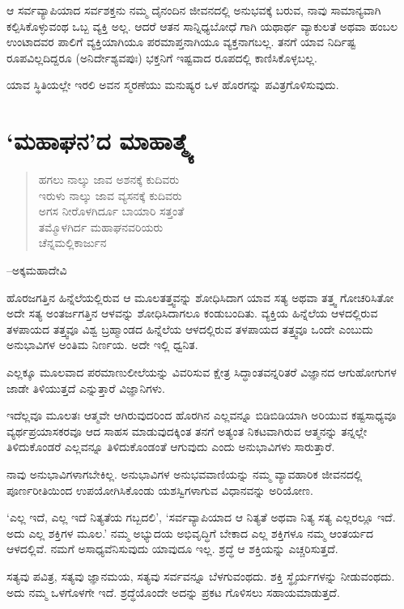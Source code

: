 ಆ ಸರ್ವವ್ಯಾಪಿಯಾದ ಸರ್ವಶಕ್ತನು ನಮ್ಮ ದೈನಂದಿನ ಜೀವನದಲ್ಲಿ ಅನುಭವಕ್ಕೆ ಬರುವ, ನಾವು ಸಾಮಾನ್ಯವಾಗಿ ಕಲ್ಪಿಸಿಕೊಳ್ಳುವಂಥ ಒಬ್ಬ ವ್ಯಕ್ತಿ ಅಲ್ಲ. ಆದರೆ ಆತನ ಸಾನ್ನಿಧ್ಯಬೋಧೆ ಗಾಗಿ ಯಥಾರ್ಥ ವ್ಯಾಕುಲತೆ ಅಥವಾ ಹಂಬಲ ಉಂಟಾದವರ ಪಾಲಿಗೆ ವ್ಯಕ್ತಿಯಾಗಿಯೂ ಪರಮಾಪ್ತನಾಗಿಯೂ ವ್ಯಕ್ತನಾಗಬಲ್ಲ. ತನಗೆ ಯಾವ ನಿರ್ದಿಷ್ಟ ರೂಪವಿಲ್ಲದಿದ್ದರೂ (ಅನಿರ್ದೇಶ್ಯ\-ವಪುಃ) ಭಕ್ತನಿಗೆ ಇಷ್ಟವಾದ ರೂಪದಲ್ಲಿ ಕಾಣಿಸಿಕೊಳ್ಳಬಲ್ಲ.

ಯಾವ ಸ್ಥಿತಿಯಲ್ಲೇ ಇರಲಿ ಅವನ ಸ್ಮರಣೆಯು ಮನುಷ್ಯರ ಒಳ ಹೊರಗನ್ನು ಪವಿತ್ರ\-ಗೊಳಿ\-ಸುವುದು.


\section*{‘ಮಹಾಘನ’ದ ಮಾಹಾತ್ಮ್ಯೆ}


\begin{verse}
ಹಗಲು ನಾಲ್ಕು ಜಾವ ಅಶನಕ್ಕೆ ಕುದಿವರು\\
 ಇರುಳು ನಾಲ್ಕು ಜಾವ ವ್ಯಸನಕ್ಕೆ ಕುದಿವರು\\
 ಅಗಸ ನೀರೊಳಗಿರ್ದೂ ಬಾಯಾರಿ ಸತ್ತಂತೆ\\
 ತಮ್ಮೊಳಗಿರ್ದ ಮಹಾಘನವರಿಯರು\\
 ಚೆನ್ನಮಲ್ಲಿಕಾರ್ಜುನ
\end{verse}

\hfill–ಅಕ್ಕಮಹಾದೇವಿ

ಹೊರಜಗತ್ತಿನ ಹಿನ್ನೆಲೆಯಲ್ಲಿರುವ ಆ ಮೂಲತತ್ತ್ವವನ್ನು ಶೋಧಿಸಿದಾಗ ಯಾವ ಸತ್ಯ ಅಥವಾ ತತ್ತ್ವ ಗೋಚರಿಸಿತೋ ಅದೇ ಸತ್ಯ ಅಂತರ್ಜಗತ್ತಿನ ಆಳವನ್ನು ಶೋಧಿಸಿದಾಗಲೂ ಕಂಡುಬಂದಿತು. ವ್ಯಕ್ತಿಯ ಹಿನ್ನೆಲೆಯ ಆಳದಲ್ಲಿರುವ ತಳಪಾಯದ ತತ್ತ್ವವೂ ವಿಶ್ವ ಬ್ರಹ್ಮಾಂಡದ ಹಿನ್ನೆಲೆಯ ಆಳದಲ್ಲಿರುವ ತಳಪಾಯದ ತತ್ತ್ವವೂ ಒಂದೇ ಎಂಬುದು ಅನುಭಾವಿಗಳ ಅಂತಿಮ ನಿರ್ಣಯ. ಅದೇ ಇಲ್ಲಿ ಧ್ವನಿತ.

ಎಲ್ಲಕ್ಕೂ ಮೂಲವಾದ ಪರಮಾಣುಲೀಲೆಯನ್ನು ವಿವರಿಸುವ ಕ್ಷೇತ್ರ ಸಿದ್ಧಾಂತವನ್ನರಿತರೆ ವಿಜ್ಞಾನದ ಆಗುಹೋಗುಗಳ ಜಾಡೇ ತಿಳಿಯುತ್ತದೆ ಎನ್ನುತ್ತಾರೆ ವಿಜ್ಞಾನಿಗಳು.

ಇದೆಲ್ಲವೂ ಮೂಲತಃ ಆತ್ಮವೇ ಆಗಿರುವುದರಿಂದ ಹೊರಗಿನ ಎಲ್ಲವನ್ನೂ ಬಿಡಿಬಿಡಿಯಾಗಿ ಅರಿಯುವ ಕಷ್ಟಸಾಧ್ಯವೂ ವ್ಯರ್ಥಪ್ರಯಾಸಕರವೂ ಆದ ಸಾಹಸ ಮಾಡುವುದಕ್ಕಿಂತ ತನಗೆ ಅತ್ಯಂತ ನಿಕಟವಾಗಿರುವ ಆತ್ಮನನ್ನು ತನ್ನಲ್ಲೇ ತಿಳಿದುಕೊಂಡರೆ ಎಲ್ಲವನ್ನೂ ತಿಳಿದುಕೊಂಡಂತೆ ಆಗುವುದು ಎಂದು ಅನುಭಾವಿಗಳು ಸಾರುತ್ತಾರೆ.

ನಾವು ಅನುಭಾವಿಗಳಾಗಬೇಕಿಲ್ಲ. ಅನುಭಾವಿಗಳ ಅನುಭವವಾಣಿಯನ್ನು ನಮ್ಮ ವ್ಯಾವ\-ಹಾರಿಕ ಜೀವನದಲ್ಲಿ ಪೂರ್ಣರೀತಿಯಿಂದ ಉಪಯೋಗಿಸಿಕೊಂಡು ಯಶಸ್ವಿಗಳಾಗುವ ವಿಧಾನವನ್ನು ಅರಿಯೋಣ.

‘ಎಲ್ಲ ಇದೆ, ಎಲ್ಲ ಇದೆ ನಿತ್ಯತೆಯ ಗಬ್ಬದಲಿ’, ‘ಸರ್ವವ್ಯಾಪಿಯಾದ ಆ ನಿತ್ಯತೆ ಅಥವಾ ನಿತ್ಯ ಸತ್ಯ ಎಲ್ಲರಲ್ಲೂ ಇದೆ. ಅದು ಎಲ್ಲ ಶಕ್ತಿಗಳ ಮೂಲ.’ ನಮ್ಮ ಅಭ್ಯುದಯ ಅಭಿವೃದ್ಧಿಗೆ ಬೇಕಾದ ಎಲ್ಲ ಶಕ್ತಿಗಳೂ ನಮ್ಮ ಆಂತರ್ಯದ ಆಳದಲ್ಲಿವೆ. ನಮಗೆ ಅಸಾಧ್ಯವೆನಿಸುವುದು ಯಾವುದೂ ಇಲ್ಲ. ಶ್ರದ್ಧೆ ಆ ಶಕ್ತಿಯನ್ನು ಎಚ್ಚರಿಸುತ್ತದೆ.

ಸತ್ಯವು ಪವಿತ್ರ, ಸತ್ಯವು ಜ್ಞಾನಮಯ, ಸತ್ಯವು ಸರ್ವವನ್ನೂ ಬೆಳಗುವಂಥದು. ಶಕ್ತಿ ಸ್ಥೈರ್ಯಗಳನ್ನು ನೀಡುವಂಥದು. ಅದು ನಮ್ಮ ಒಳಗೊಳಗೇ ಇದೆ. ಶ್ರದ್ಧೆಯೊಂದೇ ಅದನ್ನು ಪ್ರಕಟ ಗೊಳಿಸಲು ಸಹಾಯಮಾಡುತ್ತದೆ.

